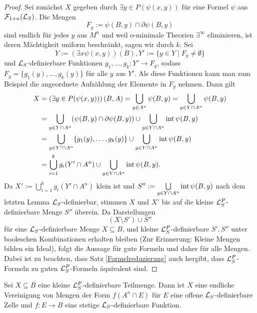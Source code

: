 \begin{proof}
	Sei zunächst $X$ gegeben durch $\exists y\in P(\psi(x,y))$ für eine Formel $\psi$ aus $\mathcal{F}_{1+n}(\mathcal{L}_S)$. Die Mengen $$F_y:=\psi(B,y)\cap\partial\psi(B,y)$$ sind endlich für jedes $y$ aus $M^n$ und weil o-minimale Theorien $\exists^\infty$ eliminieren, ist deren Mächtigkeit uniform beschränkt, sagen wir durch $k$. Sei $$Y:=(\exists x\psi(x,y))(B),Y':=\{y\in Y\mid F_y\neq\emptyset\}$$ und $\mathcal{L}_S$-definierbare Funktionen $g_1,\dots,g_k:Y'\rightarrow F_y$, sodass $F_y=\{g_1(y),\dots,g_k(y)\}$ für alle $y$ aus $Y'$. Als diese Funktionen kann man zum Beispiel die angeordnete Aufzählung der Elemente in $F_y$ nehmen. Dann gilt
	\begin{align*}
	X&=\left(\exists y\in P(\psi(x,y))\right)(B,A)=\bigcup\limits_{y\in A^n}\psi(B,y)=\bigcup\limits_{y\in Y\cap A^n}\psi(B,y)\\&=\bigcup\limits_{y\in Y\cap A^n}(\psi(B,y)\cap \partial\psi(B,y))\cup\bigcup\limits_{y\in Y\cap A^n}\operatorname{int}\psi(B,y)\\&=\bigcup\limits_{y\in Y'\cap A^n}\{g_1(y),\dots,g_k(y)\}\cup\bigcup\limits_{y\in Y\cap A^n}\operatorname{int}\psi(B,y)\\&=\bigcup\limits_{i=1}^kg_i(Y'\cap A^n)\cup \bigcup\limits_{y\in Y\cap A^n}\operatorname{int}\psi(B,y).
	\end{align*}
	Da $X':=\bigcup\limits_{i=1}^kg_i(Y'\cap A^n)$ klein ist und $S'':=\bigcup\limits_{y\in Y\cap A^n}\operatorname{int}\psi(B,y)$ nach dem letzten Lemma $\mathcal{L}_S$-definierbar, stimmen $X$ und $X'$ bis auf die kleine $\mathcal{L}^P_S$-definierbare Menge $S''$ überein. Da Darstellungen $$(X\setminus  S')\cup S''$$ für eine $\mathcal{L}_S$-definierbare Menge $X\subseteq B$, und kleine $\mathcal{L}^P_S$-definierbare $S',S''$ unter booleschen Kombinationen erhalten bleiben (Zur Erinnerung: Kleine Mengen bilden ein Ideal), folgt die Aussage für gute Formeln und daher für alle Mengen. Dabei ist zu beachten, dass Satz \ref{Formelreduzierung} auch hergibt, dass $\mathcal{L}^P_S$-Formeln zu guten $\mathcal{L}^P_S$-Formeln äquivalent sind.
\end{proof}
\newpage
\begin{lemma}
	Sei $X\subseteq B$ eine kleine $\mathcal{L}^P_S$-definierbare Teilmenge. Dann ist $X$ eine endliche Vereinigung von Mengen der Form $f(A^n\cap E)$ für $E$ eine offene $\mathcal{L}_S$-definierbare Zelle und $f:E\rightarrow B$ eine stetige $\mathcal{L}_S$-definierbare Funktion.
\end{lemma}
